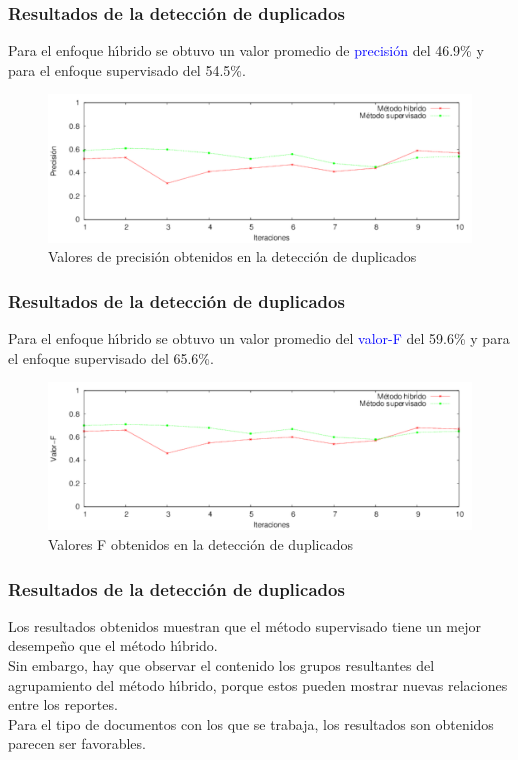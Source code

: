 \documentclass{beamer}
\begin{document}
\begin{frame}
  \frametitle{Resultados de la detecci\'{o}n de duplicados}
  Para el enfoque h\'{\i}brido se obtuvo un valor promedio de \textcolor{blue}{precisi\'{o}n} del 46.9\% y para el enfoque supervisado del 54.5\%.\\
  
  \begin{figure}
    \centering
    \includegraphics[width = 1.0\textwidth]{imagenes/precisioni3.pdf}
    \caption{Valores de precisi\'{o}n obtenidos en la detecci\'{o}n de duplicados}
    \label{resultadoPrecision}
  \end{figure}
\end{frame}

\begin{frame}
  \frametitle{Resultados de la detecci\'{o}n de duplicados}
  Para el enfoque h\'{\i}brido se obtuvo un valor promedio del \textcolor{blue}{valor-F} del 59.6\% y para el enfoque supervisado del 65.6\%.\\

  \begin{figure}
    \centering
    \includegraphics[width = 1.0\textwidth]{imagenes/fmeasurei3.pdf}
    \caption{Valores F obtenidos en la detecci\'{o}n de duplicados}
    \label{resultadoValorF}
  \end{figure}
\end{frame}

\begin{frame}
  \frametitle{Resultados de la detecci\'{o}n de duplicados}
   Los resultados obtenidos muestran que el m\'{e}todo supervisado tiene un mejor desempe\~{n}o que el m\'{e}todo h\'{\i}brido.\\ 
   \vspace{2mm}
Sin embargo, hay que observar el contenido los grupos resultantes del agrupamiento del m\'{e}todo h\'{\i}brido, porque estos pueden mostrar nuevas relaciones entre los reportes.\\
   \vspace{2mm}
   Para el tipo de documentos con los que se trabaja, los resultados son obtenidos parecen ser favorables.
\end{frame}
\end{document}
